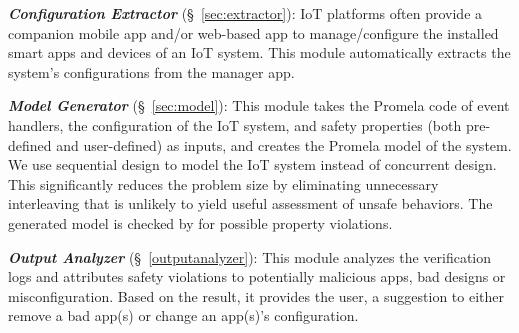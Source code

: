\textbf{\em Configuration Extractor} (\S~\ref{sec:extractor}):
IoT platforms often provide a companion mobile app and/or
web-based app to manage/configure the installed smart apps and devices of an IoT system.
This module automatically extracts the system's configurations from the manager app.

\textbf{\em Model Generator} (\S~\ref{sec:model}):
This module takes the Promela code of event handlers,
the configuration of the IoT system, and safety properties (both pre-defined and user-defined) as inputs,
and creates the Promela model of the system.
We use sequential design to model the IoT system instead of concurrent design.
This significantly reduces the problem size by eliminating
unnecessary interleaving that is unlikely to yield useful assessment of unsafe behaviors.
The generated model is checked by \spin for possible property violations.

\textbf{\em Output Analyzer} (\S~\ref{outputanalyzer}):
This module analyzes the verification logs and attributes safety violations to potentially malicious apps,
bad designs or misconfiguration.
Based on the result, it provides the user, a suggestion to either remove a bad app(s) or change an app(s)'s
configuration.



